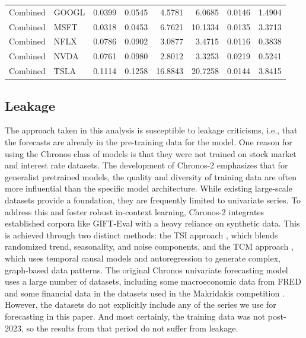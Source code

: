 \documentclass[twocolumn]{article}
\begin{document}
\begin{table}
{\begin{tabular}{llrrrrrr}
Combined & GOOGL  & 0.0399 & 0.0545  & 4.5781  & 6.0685  & 0.0146  & 1.4904  \\
Combined & MSFT   & 0.0318 & 0.0453  & 6.7621  & 10.1334 & 0.0135  & 3.3713  \\
Combined & NFLX   & 0.0786 & 0.0902  & 3.0877  & 3.4715  & 0.0116  & 0.3838  \\
Combined & NVDA   & 0.0761 & 0.0980  & 2.8012  & 3.3253  & 0.0219  & 0.5241  \\
Combined & TSLA   & 0.1114 & 0.1258  & 16.8843 & 20.7258 & 0.0144  & 3.8415 \\
\bottomrule
\end{tabular}
}
\end{table}

\subsection{Leakage}

The approach taken in this analysis is susceptible to leakage criticisms, i.e., that the forecasts are already in the pre-training data for the model. One reason for using the Chronos class of models is that they were not trained on stock market and interest rate datasets. The development of Chronos-2 \citep{ansari_chronos-2_2025} emphasizes that for generalist pretrained models, the quality and diversity of training data are often more influential than the specific model architecture. While existing large-scale datasets provide a foundation, they are frequently limited to univariate series. To address this and foster robust in-context learning, Chronos-2 integrates established corpora like GIFT-Eval with a heavy reliance on synthetic data. This is achieved through two distinct methods: the TSI approach \citep{bahrpeyma_methodology_2021}, which blends randomized trend, seasonality, and noise components, and the TCM approach \citep{runge_causal_2023}, which uses temporal causal models and autoregression to generate complex, graph-based data patterns. The original Chronos univariate forecasting model \citep{ansari_chronos_2024} uses a large number of datasets, including some macroeconomic data from FRED \citep{godahewa_monash_2021} and some financial data in the datasets used in the Makridakis competition \citep{makridakis_m4_2020}. However, the datasets do not explicitly include any of the series we use for forecasting in this paper. And most certainly, the training data was not post-2023, so the results from that period do not suffer from leakage. 
\end{document}
